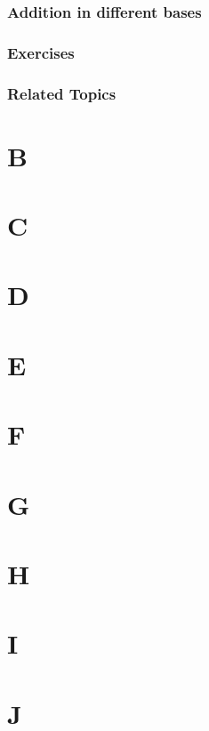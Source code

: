 \documentclass[a4paper]{book}
\begin{document}
\subsection{Addition in different bases}

\subsection{Exercises}

\subsection{Related Topics}


\chapter{B}

\chapter{C}

\chapter{D}

\chapter{E}

\chapter{F}

\chapter{G}

\chapter{H}

\chapter{I}

\chapter{J}
\end{document}
